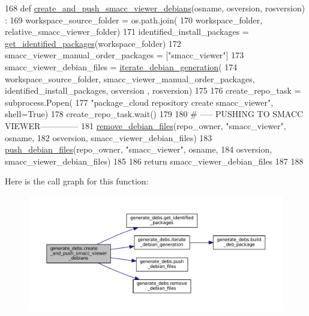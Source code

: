 \begin{DoxyCode}
168 \textcolor{keyword}{def }\hyperlink{namespacegenerate__debs_a9a6167ed98fbdc7b1e1c56da5652cf19}{create\_and\_push\_smacc\_viewer\_debians}(osname, osversion, rosversion)
      :
169     workspace\_source\_folder = os.path.join(
170         workspace\_folder, relative\_smacc\_viewer\_folder)
171     identified\_install\_packages = \hyperlink{namespacegenerate__debs_aa91b87c6d9c3ed04015845cc9298431a}{get\_identified\_packages}(workspace\_folder)
172     smacc\_viewer\_manual\_order\_packages = [\textcolor{stringliteral}{"smacc\_viewer"}]
173     smacc\_viewer\_debian\_files = \hyperlink{namespacegenerate__debs_a2615a6fc7860b6aa9e920e6b4d886589}{iterate\_debian\_generation}(
174         workspace\_source\_folder, smacc\_viewer\_manual\_order\_packages, identified\_install\_packages, osversion
      , rosversion)
175 
176     create\_repo\_task = subprocess.Popen(
177         \textcolor{stringliteral}{"package\_cloud repository create smacc\_viewer"}, shell=\textcolor{keyword}{True})
178     create\_repo\_task.wait()
179 
180     \textcolor{comment}{# ----- PUSHING TO SMACC VIEWER--------------}
181     \hyperlink{namespacegenerate__debs_a08095040d038b3613ad0e77fd4e7f60e}{remove\_debian\_files}(repo\_owner, \textcolor{stringliteral}{"smacc\_viewer"},  osname,
182                         osversion, smacc\_viewer\_debian\_files)
183     \hyperlink{namespacegenerate__debs_a9b22f5ad65b40b7903c467eda308e575}{push\_debian\_files}(repo\_owner, \textcolor{stringliteral}{"smacc\_viewer"}, osname,
184                       osversion, smacc\_viewer\_debian\_files)
185 
186     \textcolor{keywordflow}{return} smacc\_viewer\_debian\_files
187 
188 
\end{DoxyCode}
Here is the call graph for this function\+:
\nopagebreak
\begin{figure}[H]
\begin{center}
\leavevmode
\includegraphics[width=350pt]{namespacegenerate__debs_a9a6167ed98fbdc7b1e1c56da5652cf19_cgraph}
\end{center}
\end{figure}
\mbox{\label{namespacegenerate__debs_aa91b87c6d9c3ed04015845cc9298431a}} 
